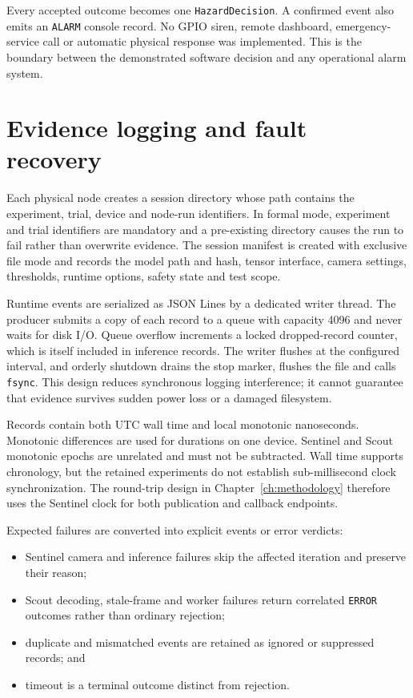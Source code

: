 Every accepted outcome becomes one \texttt{HazardDecision}. A confirmed event
also emits an \texttt{ALARM} console record. No GPIO siren, remote dashboard,
emergency-service call or automatic physical response was implemented. This is
the boundary between the demonstrated software decision and any operational
alarm system.

\section{Evidence logging and fault recovery}
\label{sec:implementation:logging}

Each physical node creates a session directory whose path contains the
experiment, trial, device and node-run identifiers. In formal mode, experiment
and trial identifiers are mandatory and a pre-existing directory causes the
run to fail rather than overwrite evidence. The session manifest is created
with exclusive file mode and records the model path and hash, tensor interface,
camera settings, thresholds, runtime options, safety state and test scope.

Runtime events are serialized as JSON Lines by a dedicated writer thread. The
producer submits a copy of each record to a queue with capacity 4096 and never
waits for disk I/O. Queue overflow increments a locked dropped-record counter,
which is itself included in inference records. The writer flushes at the
configured interval, and orderly shutdown drains the stop marker, flushes the
file and calls \texttt{fsync}. This design reduces synchronous logging
interference; it cannot guarantee that evidence survives sudden power loss or a
damaged filesystem.

Records contain both UTC wall time and local monotonic nanoseconds. Monotonic
differences are used for durations on one device. Sentinel and Scout monotonic
epochs are unrelated and must not be subtracted. Wall time supports chronology,
but the retained experiments do not establish sub-millisecond clock
synchronization. The round-trip design in Chapter~\ref{ch:methodology} therefore
uses the Sentinel clock for both publication and callback endpoints.

Expected failures are converted into explicit events or error verdicts:

\begin{itemize}
  \item Sentinel camera and inference failures skip the affected iteration and
  preserve their reason;
  \item Scout decoding, stale-frame and worker failures return correlated
  \texttt{ERROR} outcomes rather than ordinary rejection;
  \item duplicate and mismatched events are retained as ignored or suppressed
  records; and
  \item timeout is a terminal outcome distinct from rejection.
\end{itemize}

